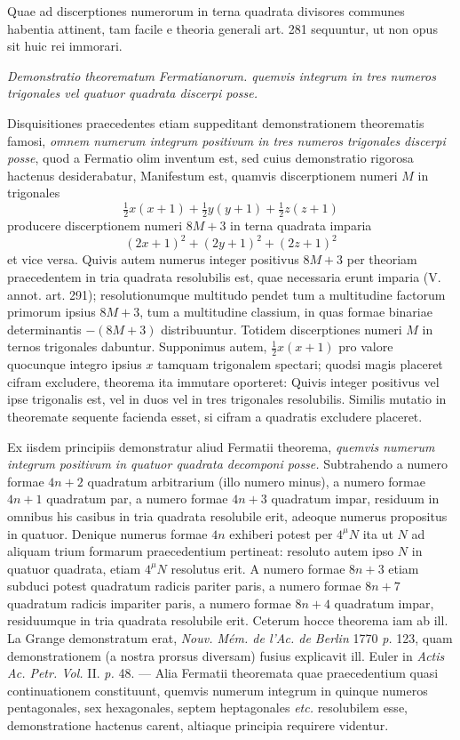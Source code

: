 Quae ad discerptiones numerorum in terna quadrata divisores communes habentia attinent, tam facile e theoria generali art. 281 sequuntur, ut non opus sit huic rei immorari.

\begin{center}\textit{Demonstratio theorematum Fermatianorum. quemvis integrum in tres numeros trigonales vel quatuor quadrata discerpi posse.}\end{center}
Disquisitiones praecedentes etiam suppeditant demonstrationem theorematis famosi, \textit{omnem numerum integrum positivum in tres numeros trigonales discerpi posse}, quod a Fermatio olim inventum est, sed cuius demonstratio rigorosa hactenus desiderabatur, Manifestum est, quamvis discerptionem numeri \(M\) in trigonales
\[
\tfrac12 x(x+1)+\tfrac12 y(y+1)+\tfrac12 z(z+1)
\]
producere discerptionem numeri \(8M+3\) in terna quadrata imparia
\[
(2x+1)^2+(2y+1)^2+(2z+1)^2
\]
et vice versa. Quivis autem numerus integer positivus \(8M+3\) per theoriam praecedentem in tria quadrata resolubilis est, quae necessaria erunt imparia (V. annot. art. 291); resolutionumque multitudo pendet tum a multitudine factorum primorum ipsius \(8M+3\), tum a multitudine classium, in quas formae binariae determinantis \(-(8M+3)\) distribuuntur. Totidem discerptiones numeri \(M\) in ternos trigonales dabuntur. Supponimus autem, \(\frac12 x(x+1)\) pro valore quocunque integro ipsius \(x\) tamquam trigonalem spectari; quodsi magis placeret cifram excludere, theorema ita immutare oporteret: Quivis integer positivus vel ipse trigonalis est, vel in duos vel in tres trigonales resolubilis. Similis mutatio in theoremate sequente facienda esset, si cifram a quadratis excludere placeret.

Ex iisdem principiis demonstratur aliud Fermatii theorema, \textit{quemvis numerum integrum positivum in quatuor quadrata decomponi posse.} Subtrahendo a numero formae \(4n+2\) quadratum arbitrarium (illo numero minus), a numero formae
\(4n+1\) quadratum par, a numero formae \(4n+3\) quadratum impar, residuum in omnibus his casibus in tria quadrata resolubile erit, adeoque numerus propositus in quatuor. Denique numerus formae \(4n\) exhiberi potest per \(4^{\mu}N\) ita ut \(N\) ad aliquam trium formarum praecedentium pertineat: resoluto autem ipso \(N\) in quatuor quadrata, etiam \(4^{\mu}N\) resolutus erit. A numero formae \(8n+3\) etiam subduci potest quadratum radicis pariter paris, a numero formae \(8n+7\) quadratum radicis impariter paris, a numero formae \(8n+4\) quadratum impar, residuumque in tria quadrata resolubile erit. Ceterum hocce theorema iam ab ill. La Grange demonstratum erat, \textit{Nouv. Mém. de l'Ac. de Berlin} 1770 \textit{p.} 123, quam demonstrationem (a nostra prorsus diversam) fusius explicavit ill. Euler in \textit{Actis Ac. Petr. Vol.} II. \textit{p.} 48. --- Alia Fermatii theoremata quae praecedentium quasi continuationem constituunt, quemvis numerum integrum in quinque numeros pentagonales, sex hexagonales, septem heptagonales \textit{etc.} resolubilem esse, demonstratione hactenus carent, altiaque principia requirere videntur.

